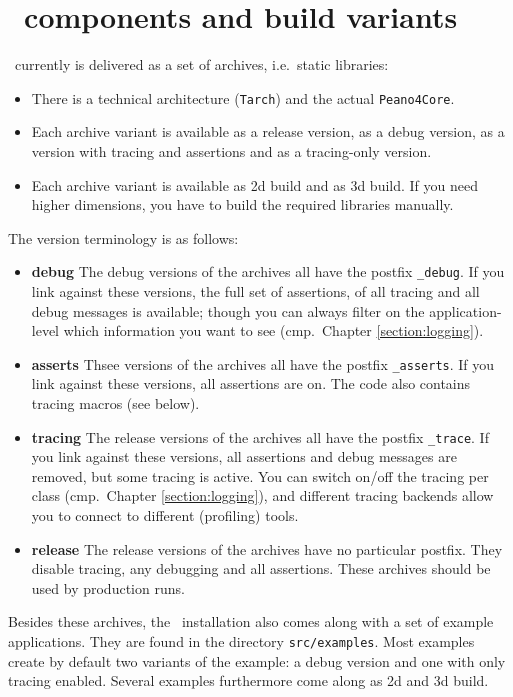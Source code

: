 \section{\Peano\ components and build variants}

\Peano\ currently is delivered as a set of archives, i.e.~static libraries:
\begin{itemize}
  \item There is a technical architecture (\texttt{Tarch}) and the actual
  \texttt{Peano4Core}.
  \item Each archive variant is available as a release version, as a debug
  version, as a version with tracing and assertions and as a tracing-only
  version.
  \item Each archive variant is available as 2d build and as 3d build. If you
  need higher dimensions, you have to build the required libraries manually.
\end{itemize}


The version terminology is as follows:
\begin{itemize}
  \item {\bf debug} The debug versions of the archives all have the postfix
  \texttt{\_debug}. If you link against these versions, the full set of
  assertions, of all tracing and all debug messages is available; though you can
  always filter on the application-level which information you want to see
  (cmp.~Chapter \ref{section:logging}).
  \item {\bf asserts} Thsee versions of the archives all have the postfix
  \texttt{\_asserts}. If you link against these versions, all assertions are on.
  The code also contains tracing macros (see below).
  \item {\bf tracing} The release versions of the archives all have the postfix
  \texttt{\_trace}. If you link against these versions, all assertions and debug
  messages are removed, but some tracing is active. You can switch on/off the
  tracing per class (cmp.~Chapter \ref{section:logging}), and different tracing
  backends allow you to connect to different (profiling) tools.
  \item {\bf release} The release versions of the archives have no
  particular postfix. They disable tracing, any debugging and all assertions.
  These archives should be used by production runs.
\end{itemize}


\noindent
Besides these archives, the \Peano\ installation also comes along with a set of
example applications.
They are found in the directory \texttt{src/examples}.
Most examples create by default two variants of the example: a debug
version and one with only tracing enabled.
Several examples furthermore come along as 2d and 3d build.



